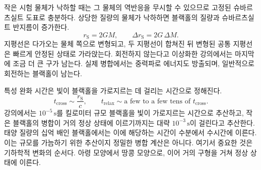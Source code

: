 작은 시험 물체가 낙하할 때는 그 물체의 역반응을 무시할 수 있으므로 고정된 슈바르츠실트 도표로 충분하다. 상당한 질량의 물체가 낙하하면 블랙홀의 질량과 슈바르츠실트 반지름이 증가한다.
\begin{equation}
r_{\mathrm S}=2GM,
\qquad
\Delta r_{\mathrm S}=2G\,\Delta M.
\label{eq:l7-growing-radius}
\end{equation}
지평선은 다가오는 물체 쪽으로 변형되고, 두 지평선이 합쳐진 뒤 변형된 공통 지평선은 빠르게 안정된 상태로 가라앉는다. 회전하지 않는다고 이상화한 강의에서는 마지막에 조금 더 큰 구가 남는다. 실제 병합에서는 중력파로 에너지도 방출되며, 일반적으로 회전하는 블랙홀이 남는다.

\begin{classroomqa}
\end{classroomqa}

\begin{classroomqa}
\end{classroomqa}

특성 완화 시간은 빛이 블랙홀을 가로지르는 데 걸리는 시간으로 정해진다.
\begin{equation}
t_{\mathrm{cross}}\sim\frac{r_{\mathrm S}}{c},
\qquad
t_{\mathrm{relax}}\sim
\text{a few to a few tens of }t_{\mathrm{cross}}.
\label{eq:l7-relaxation-scale}
\end{equation}
강의에서는 \(10^{-5}\,\mathrm{s}\)를 킬로미터 규모 블랙홀을 빛이 가로지르는 시간으로 추산하고, 작은 블랙홀의 병합이 거의 정상 상태에 이르기까지는 대략 \(10^{-3}\,\mathrm{s}\)이 걸린다고 추산한다. 태양 질량의 십억 배인 블랙홀에서는 이에 해당하는 시간이 수분에서 수시간에 이른다. 이는 규모를 가늠하기 위한 추산이지 정밀한 병합 계산은 아니다. 여기서 중요한 것은 기하학적 변화의 순서다. 아령 모양에서 땅콩 모양으로, 이어 거의 구형을 거쳐 정상 상태에 이른다.

